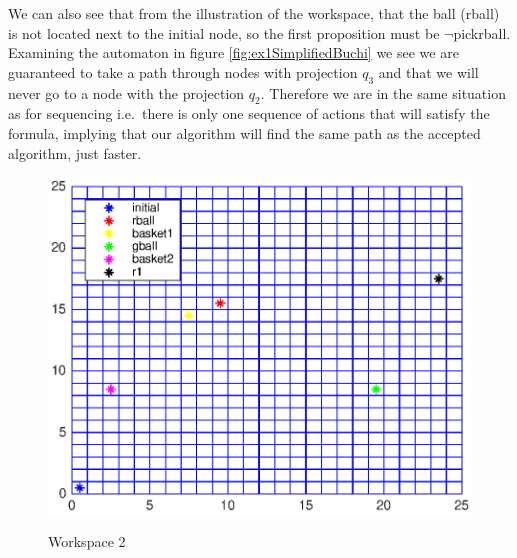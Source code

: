 We can also see that from the illustration of the workspace, that the ball (rball) is not located next to the initial node, so the first proposition must be $\neg$pickrball. Examining the automaton in figure \ref{fig:ex1SimplifiedBuchi} we see we are guaranteed to take a path through nodes with projection $q_3$ and that we will never go to a node with the projection $q_2$. Therefore we are in the same situation as for sequencing i.e.\ there is only one sequence of actions that will satisfy the formula, implying that our algorithm will find the same path as the accepted algorithm, just faster. 

\begin{figure}[!htb]
\centering
\includegraphics[scale=1]{workspace2.eps}
\label{fig:workspace2}
\caption{Workspace 2}
\end{figure}

